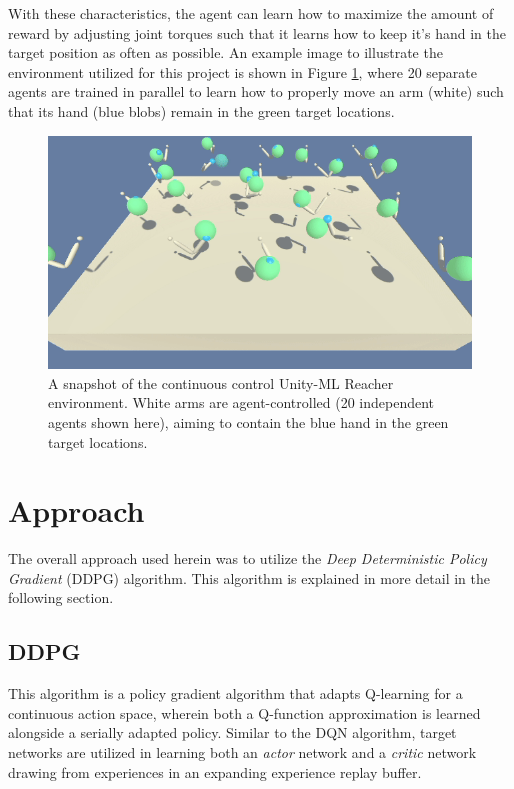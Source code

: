 \documentclass[11pt]{article}
\begin{document}
\FloatBarrier

With these characteristics, the agent can learn how to maximize the amount of reward by adjusting joint torques such that it learns how to keep it's hand in the target position as often as possible. An example image to illustrate the environment utilized for this project is shown in Figure \ref{fig:example-game-image}, where 20 separate agents are trained in parallel to learn how to properly move an arm (white) such that its hand (blue blobs) remain in the green target locations.

\begin{figure}[!ht]
	\centering
	\includegraphics[width=0.75\linewidth]{images/example-env-image.png}
	\caption{A snapshot of the continuous control Unity-ML Reacher environment. White arms are agent-controlled (20 independent agents shown here), aiming to contain the blue hand in the green target locations.}
	\label{fig:example-game-image}
\end{figure}

\FloatBarrier

\section{Approach}

The overall approach used herein was to utilize the \textit{Deep Deterministic Policy Gradient} (DDPG) algorithm. This algorithm is explained in more detail in the following section.

\subsection{DDPG}

This algorithm is a policy gradient algorithm that adapts Q-learning for a continuous action space, wherein both a Q-function approximation is learned alongside a serially adapted policy. Similar to the DQN algorithm, target networks are utilized in learning both an \textit{actor} network and a \textit{critic} network drawing from experiences in an expanding experience replay buffer.
\end{document}
